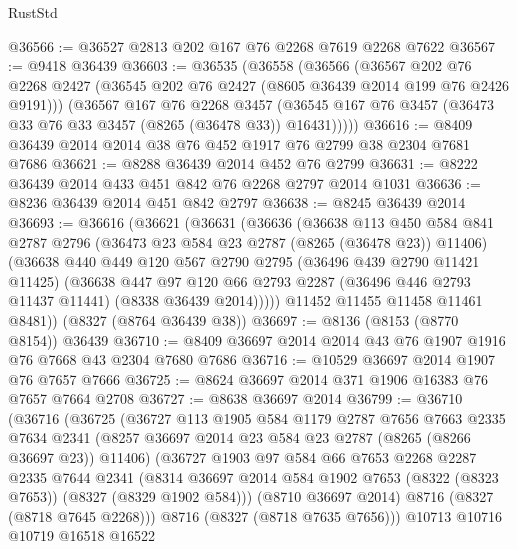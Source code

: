 \begin{lexlean}{RustStd}
\begin{coremodule}
@36566 := @36527 @2813 @202 @167 @76 @2268 @7619 @2268 @7622
@36567 := @9418 @36439
@36603 := @36535
    (@36558
      (@36566
        (@36567
          @202
          @76
          @2268
          @2427
          (@36545 @202 @76 @2427 (@8605 @36439 @2014 @199 @76 @2426 @9191)))
        (@36567
          @167
          @76
          @2268
          @3457
          (@36545 @167 @76 @3457 (@36473 @33 @76 @33 @3457 (@8265 (@36478 @33)) @16431)))))
@36616 := @8409 @36439 @2014 @2014 @38 @76 @452 @1917 @76 @2799 @38 @2304 @7681 @7686
@36621 := @8288 @36439 @2014 @452 @76 @2799
@36631 := @8222 @36439 @2014 @433 @451 @842 @76 @2268 @2797 @2014 @1031
@36636 := @8236 @36439 @2014 @451 @842 @2797
@36638 := @8245 @36439 @2014
@36693 := @36616
    (@36621
      (@36631
        (@36636
          (@36638
            @113
            @450
            @584
            @841
            @2787
            @2796
            (@36473 @23 @584 @23 @2787 (@8265 (@36478 @23)) @11406)
            (@36638
              @440
              @449
              @120
              @567
              @2790
              @2795
              (@36496 @439 @2790 @11421 @11425)
              (@36638
                @447
                @97
                @120
                @66
                @2793
                @2287
                (@36496 @446 @2793 @11437 @11441)
                (@8338 @36439 @2014)))))
        @11452
        @11455
        @11458
        @11461
        @8481))
    (@8327 (@8764 @36439 @38))
@36697 := @8136 (@8153 (@8770 @8154)) @36439
@36710 := @8409 @36697 @2014 @2014 @43 @76 @1907 @1916 @76 @7668 @43 @2304 @7680 @7686
@36716 := @10529 @36697 @2014 @1907 @76 @7657 @7666
@36725 := @8624 @36697 @2014 @371 @1906 @16383 @76 @7657 @7664 @2708
@36727 := @8638 @36697 @2014
@36799 := @36710
    (@36716
      (@36725
        (@36727
          @113
          @1905
          @584
          @1179
          @2787
          @7656
          @7663
          @2335
          @7634
          @2341
          (@8257 @36697 @2014 @23 @584 @23 @2787 (@8265 (@8266 @36697 @23)) @11406)
          (@36727
            @1903
            @97
            @584
            @66
            @7653
            @2268
            @2287
            @2335
            @7644
            @2341
            (@8314 @36697 @2014 @584 @1902 @7653 (@8322 (@8323 @7653)) (@8327 (@8329 @1902 @584)))
            (@8710 @36697 @2014)
            @8716
            (@8327 (@8718 @7645 @2268)))
          @8716
          (@8327 (@8718 @7635 @7656)))
        @10713
        @10716
        @10719
        @16518
        @16522

\end{coremodule}
\end{lexlean}

